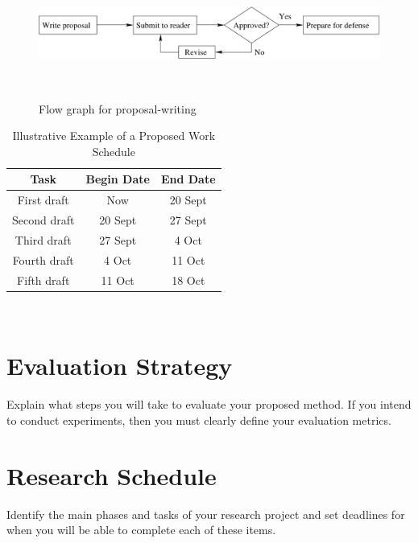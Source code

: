 \documentclass[11pt]{article}
\begin{document}
\begin{figure}[htbp]
  \centering
  \includegraphics[width=5in]{flow.pdf}
  \caption{Flow graph for proposal-writing}~\label{intro-fig1}
\end{figure}

\begin{table}[htbp]
  \centering
  \begin{tabular}{|c||c|c|}
    \hline

    \bf Task     & \bf Begin Date & \bf End Date \\ \hline\hline
    First draft  & Now            & 20 Sept      \\ \hline
    Second draft & 20 Sept        & 27 Sept      \\ \hline
    Third draft  & 27 Sept        & 4 Oct        \\ \hline
    Fourth draft & 4 Oct          & 11 Oct       \\ \hline
    Fifth draft  & 11 Oct         & 18 Oct       \\ \hline

  \end{tabular}
  \caption{Illustrative Example of a Proposed Work Schedule}~\label{intro-tab1}
\end{table}

\section{Evaluation Strategy}
\label{sec:evaluate}


Explain what steps you will take to evaluate your proposed method. If you intend
to conduct experiments, then you must clearly define your evaluation metrics.

\section{Research Schedule}
\label{sec:schedule}

Identify the main phases and tasks of your research project and set deadlines
for when you will be able to complete each of these items.
\end{document}
